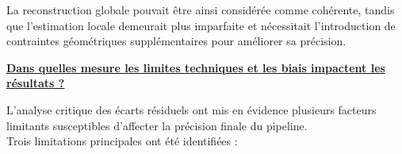 \documentclass[12pt,a4paper,oneside]{report}
\begin{document}
\hspace*{1cm}La reconstruction globale pouvait être ainsi considérée comme cohérente, tandis que l'estimation locale demeurait plus imparfaite et nécessitait l'introduction de contraintes géométriques supplémentaires pour améliorer sa précision.

\vspace{1cm}

\noindent\textbf{\uline{\large Dans quelles mesure les limites techniques et les biais impactent les résultats ?}}\par
\medskip

\vspace{0.5cm}

\hspace*{1cm}L'analyse critique des écarts résiduels ont mis en évidence plusieurs facteurs limitants susceptibles d'affecter la précision finale du pipeline. \\
\hspace*{0.5cm}Trois limitations principales ont été identifiées :\vspace{0.02cm}
\end{document}
